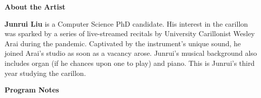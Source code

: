 \documentclass[11pt, letterpaper]{article}
\begin{document}
\textbf{About the Artist}

\begin{small}
    \textbf{Junrui Liu} is a Computer Science PhD candidate. His interest in the carillon was sparked by a series of live-streamed recitals by University Carillonist Wesley Arai during the pandemic. Captivated by the instrument’s unique sound, he joined Arai's studio as soon as a vacancy arose. Junrui's musical background also includes organ (if he chances upon one to play) and piano. This is Junrui's third year studying the carillon. \par
\end{small}

\vfill
{}

\vfill

\newpage

\textbf{Program Notes}
\newcommand{\divider}{\vspace{.5em}}
\end{document}
